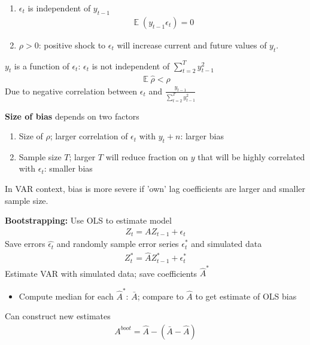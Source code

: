 \documentclass{beamer}
\begin{document}
\begin{frame}
 \begin{enumerate}
   \item $\epsilon_t$ is independent of $y_{t-1}$ 
   \begin{align}
    \mathop{\mathbb{E}}(y_{t-1}\epsilon_t)= 0  
 \end{align}
   \item $\rho>0$: positive shock to $\epsilon_t$ will increase current and future values of $y_t$.
 \end{enumerate}
 \medskip
 $y_t$ is a function of $\epsilon_t$: $\epsilon_t$ is not independent of $\sum^T_{t=2}y^2_{t-1}$
 \begin{align}     
     \mathop{\mathbb{E}} \hat{\rho}<\rho
   \end{align} 
 Due to negative correlation between $\epsilon_t$ and $\frac{y_{t-1}}{\sum_{t=2}^T y^2_{t-1}}$ 
\end{frame}

\begin{frame}
 \textbf{Size of bias} depends on two factors \medskip
 \begin{enumerate}
  \item Size of $\rho$; larger correlation of $\epsilon_t$ with $y_t+n$: larger bias
  \medskip
  \item Sample size $T$; larger $T$ will reduce fraction on $y$ that will be highly correlated with $\epsilon_t$: smaller bias
\end{enumerate}
\medskip
In VAR context, bias is more severe if 'own' lag coefficients are larger and smaller sample size.
\end{frame}

\begin{frame}
  \textbf{Bootstrapping:} 
   Use OLS to estimate model 
   \begin{align}
     Z_t= AZ_{t-1} + \epsilon_t
   \end{align}
   \medskip
   Save errors $\hat{\epsilon_t}$ and randomly sample error series $\epsilon^*_t$ and simulated data
   \begin{align}
     Z^*_t= \hat{A}Z^*_{t-1} + \epsilon^*_t
   \end{align}
   \medskip
    Estimate VAR with simulated data; save coefficients $\hat{A}^*$
    \begin{itemize}
      \item Compute median for each $\hat{A}^*$: $\bar{A}$; compare to $\hat{A}$ to get estimate of OLS bias
    \end{itemize}
    \medskip
    Can construct new estimates 
    \begin{align}
      A^{boot} = \hat{A}-(\bar{A}-\hat{A})
    \end{align}  
\end{frame}
\end{document}
